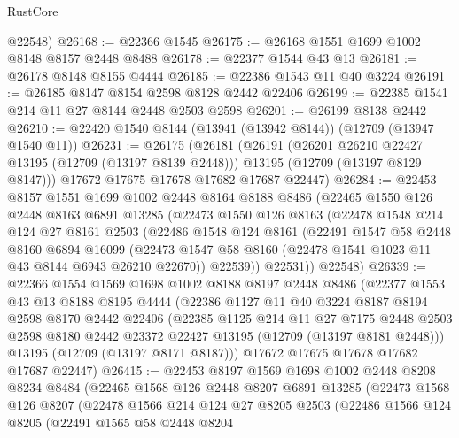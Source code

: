 \begin{lexlean}{RustCore}
\begin{coremodule}
      @22548)
@26168 := @22366 @1545
@26175 := @26168 @1551 @1699 @1002 @8148 @8157 @2448 @8488
@26178 := @22377 @1544 @43 @13
@26181 := @26178 @8148 @8155 @4444
@26185 := @22386 @1543 @11 @40 @3224
@26191 := @26185 @8147 @8154 @2598 @8128 @2442 @22406
@26199 := @22385 @1541 @214 @11 @27 @8144 @2448 @2503 @2598
@26201 := @26199 @8138 @2442
@26210 := @22420 @1540 @8144 (@13941 (@13942 @8144)) (@12709 (@13947 @1540 @11))
@26231 := @26175
    (@26181
      (@26191
        (@26201 @26210 @22427 @13195 (@12709 (@13197 @8139 @2448)))
        @13195
        (@12709 (@13197 @8129 @8147)))
      @17672
      @17675
      @17678
      @17682
      @17687
      @22447)
@26284 := @22453
    @8157
    @1551
    @1699
    @1002
    @2448
    @8164
    @8188
    @8486
    (@22465
      @1550
      @126
      @2448
      @8163
      @6891
      @13285
      (@22473
        @1550
        @126
        @8163
        (@22478
          @1548
          @214
          @124
          @27
          @8161
          @2503
          (@22486
            @1548
            @124
            @8161
            (@22491
              @1547
              @58
              @2448
              @8160
              @6894
              @16099
              (@22473 @1547 @58 @8160 (@22478 @1541 @1023 @11 @43 @8144 @6943 @26210 @22670))
              @22539))
          @22531))
      @22548)
@26339 := @22366
    @1554
    @1569
    @1698
    @1002
    @8188
    @8197
    @2448
    @8486
    (@22377
      @1553
      @43
      @13
      @8188
      @8195
      @4444
      (@22386
        @1127
        @11
        @40
        @3224
        @8187
        @8194
        @2598
        @8170
        @2442
        @22406
        (@22385
          @1125
          @214
          @11
          @27
          @7175
          @2448
          @2503
          @2598
          @8180
          @2442
          @23372
          @22427
          @13195
          (@12709 (@13197 @8181 @2448)))
        @13195
        (@12709 (@13197 @8171 @8187)))
      @17672
      @17675
      @17678
      @17682
      @17687
      @22447)
@26415 := @22453
    @8197
    @1569
    @1698
    @1002
    @2448
    @8208
    @8234
    @8484
    (@22465
      @1568
      @126
      @2448
      @8207
      @6891
      @13285
      (@22473
        @1568
        @126
        @8207
        (@22478
          @1566
          @214
          @124
          @27
          @8205
          @2503
          (@22486
            @1566
            @124
            @8205
            (@22491
              @1565
              @58
              @2448
              @8204

\end{coremodule}
\end{lexlean}
